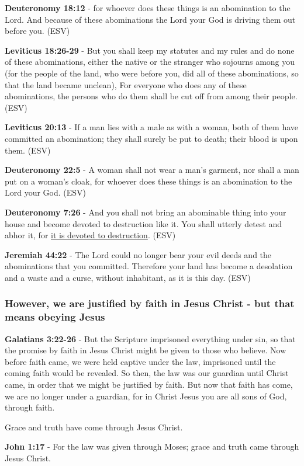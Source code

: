\documentclass[11pt]{article}
\begin{document}
\textbf{Deuteronomy 18:12} - for whoever does these things is an abomination to the Lord. And because of these abominations the Lord your God is driving them out before you. (ESV)

\textbf{Leviticus 18:26-29} - But you shall keep my statutes and my rules and do none of these abominations, either the native or the stranger who sojourns among you (for the people of the land, who were before you, did all of these abominations, so that the land became unclean), For everyone who does any of these abominations, the persons who do them shall be cut off from among their people. (ESV)

\textbf{Leviticus 20:13} - If a man lies with a male as with a woman, both of them have committed an abomination; they shall surely be put to death; their blood is upon them. (ESV)

\textbf{Deuteronomy 22:5} - A woman shall not wear a man's garment, nor shall a man put on a woman's cloak, for whoever does these things is an abomination to the Lord your God. (ESV)

\textbf{Deuteronomy 7:26} - And you shall not bring an abominable thing into your house and become devoted to destruction like it. You shall utterly detest and abhor it, for \uline{it is devoted to destruction}. (ESV)

\textbf{Jeremiah 44:22} - The Lord could no longer bear your evil deeds and the abominations that you committed. Therefore your land has become a desolation and a waste and a curse, without inhabitant, as it is this day. (ESV)

\subsubsection{However, we are justified by faith in Jesus Christ - but that means obeying Jesus}
\label{sec:org492368b}
\textbf{Galatians 3:22-26} - But the Scripture imprisoned everything under sin, so that the promise by faith in Jesus Christ might be given to those who believe. Now before faith came, we were held captive under the law, imprisoned until the coming faith would be revealed. So then, the law was our guardian until Christ came, in order that we might be justified by faith. But now that faith has come, we are no longer under a guardian, for in Christ Jesus you are all sons of God, through faith.

Grace and truth have come through Jesus Christ.

\textbf{John 1:17} - For the law was given through Moses; grace and truth came through Jesus Christ.
\end{document}
